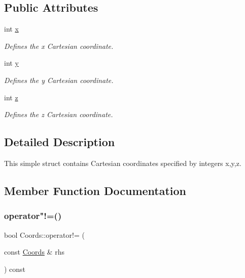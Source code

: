 \subsection*{Public Attributes}
\begin{DoxyCompactItemize}
\item 
\mbox{\label{struct_coords_a59992d986e76375f31828d32c05cd15d}} 
int \hyperlink{struct_coords_a59992d986e76375f31828d32c05cd15d}{x}
\begin{DoxyCompactList}\small\item\em Defines the x Cartesian coordinate. \end{DoxyCompactList}\item 
\mbox{\label{struct_coords_a7ed64d02fb7550f1506a93fcfab7f16f}} 
int \hyperlink{struct_coords_a7ed64d02fb7550f1506a93fcfab7f16f}{y}
\begin{DoxyCompactList}\small\item\em Defines the y Cartesian coordinate. \end{DoxyCompactList}\item 
\mbox{\label{struct_coords_a96d176173dbd5d97e7af63e1b5c0f7e1}} 
int \hyperlink{struct_coords_a96d176173dbd5d97e7af63e1b5c0f7e1}{z}
\begin{DoxyCompactList}\small\item\em Defines the z Cartesian coordinate. \end{DoxyCompactList}\end{DoxyCompactItemize}


\subsection{Detailed Description}
This simple struct contains Cartesian coordinates specified by integers x,y,z. 

\subsection{Member Function Documentation}
\mbox{\label{struct_coords_aaea2c566feec4e4bf56b27a34568be76}} 
\subsubsection{\texorpdfstring{operator"!=()}{operator!=()}}
{\footnotesize\ttfamily bool Coords\+::operator!= (\begin{DoxyParamCaption}\item[{const \hyperlink{struct_coords}{Coords} \&}]{rhs }\end{DoxyParamCaption}) const\hspace{0.3cm}{\ttfamily [inline]}}



